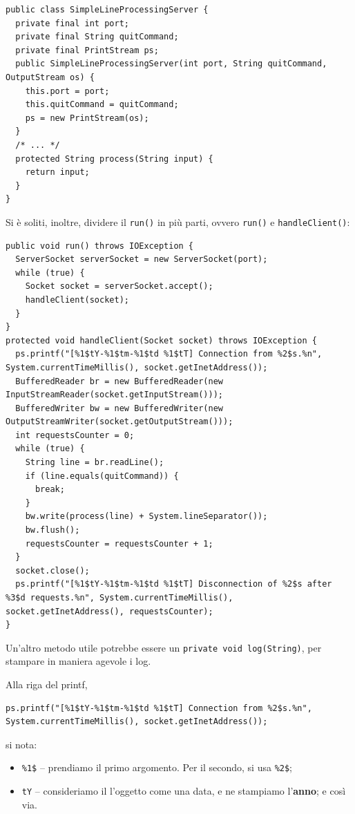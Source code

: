 \documentclass[\fontsizeclass,twocolumn]{\classname}
\theoremstyle{definition}
\theoremstyle{definition}
\begin{document}
\begin{lstlisting}
public class SimpleLineProcessingServer {
  private final int port;
  private final String quitCommand;
  private final PrintStream ps;
  public SimpleLineProcessingServer(int port, String quitCommand, OutputStream os) {
    this.port = port;
    this.quitCommand = quitCommand;
    ps = new PrintStream(os);
  }
  /* ... */
  protected String process(String input) {
    return input;
  }
}
\end{lstlisting}

Si è soliti, inoltre, dividere il \texttt{run()} in più parti, ovvero
\texttt{run()} e \texttt{handleClient()}:

\begin{lstlisting}
public void run() throws IOException {
  ServerSocket serverSocket = new ServerSocket(port);
  while (true) {
    Socket socket = serverSocket.accept();
    handleClient(socket);
  }
}
protected void handleClient(Socket socket) throws IOException {
  ps.printf("[%1$tY-%1$tm-%1$td %1$tT] Connection from %2$s.%n", System.currentTimeMillis(), socket.getInetAddress());
  BufferedReader br = new BufferedReader(new InputStreamReader(socket.getInputStream()));
  BufferedWriter bw = new BufferedWriter(new OutputStreamWriter(socket.getOutputStream()));
  int requestsCounter = 0;
  while (true) {
    String line = br.readLine();
    if (line.equals(quitCommand)) {
      break;
    }
    bw.write(process(line) + System.lineSeparator());
    bw.flush();
    requestsCounter = requestsCounter + 1;
  }
  socket.close();
  ps.printf("[%1$tY-%1$tm-%1$td %1$tT] Disconnection of %2$s after %3$d requests.%n", System.currentTimeMillis(), socket.getInetAddress(), requestsCounter);
}
\end{lstlisting}

Un'altro metodo utile potrebbe essere un \texttt{private void log(String)}, per
stampare in maniera agevole i log.

Alla riga del printf,


\begin{lstlisting}
ps.printf("[%1$tY-%1$tm-%1$td %1$tT] Connection from %2$s.%n", System.currentTimeMillis(), socket.getInetAddress());
\end{lstlisting}

si nota:
\begin{itemize}
    \item \texttt{\%1\$} -- prendiamo il primo argomento. Per il secondo, si
        usa \texttt{\%2\$};
    \item \texttt{tY} -- consideriamo il l'oggetto come una data, e ne
        stampiamo l'\textbf{anno}; e così via.
\end{itemize}
\end{document}
